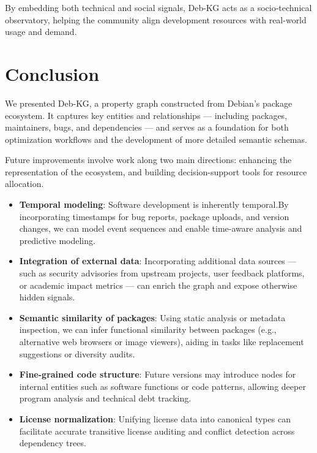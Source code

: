 \documentclass[10pt,oneside,a4paper, twocolumn]{article}
\begin{document}
    By embedding both technical and social signals, Deb-KG acts as a socio-technical observatory, helping the community align development resources with real-world usage and demand.


    \section{Conclusion}

    We presented Deb-KG, a property graph constructed from Debian’s package ecosystem.
    It captures key entities and relationships — including packages, maintainers, bugs, and dependencies — and serves as a foundation for both optimization workflows and the development of more detailed semantic schemas.

    Future improvements involve work along two main directions: enhancing the representation of the ecosystem, and building decision-support tools for resource allocation.

    \begin{itemize}
        \item \textbf{Temporal modeling}: Software development is inherently temporal.By incorporating timestamps for bug reports, package uploads, and version changes, we can model event sequences and enable time-aware analysis and predictive modeling.

        \item \textbf{Integration of external data}: Incorporating additional data sources — such as security advisories from upstream projects, user feedback platforms, or academic impact metrics — can enrich the graph and expose otherwise hidden signals.

        \item \textbf{Semantic similarity of packages}: Using static analysis or metadata inspection, we can infer functional similarity between packages (e.g., alternative web browsers or image viewers), aiding in tasks like replacement suggestions or diversity audits.

        \item \textbf{Fine-grained code structure}: Future versions may introduce nodes for internal entities such as software functions or code patterns, allowing deeper program analysis and technical debt tracking.

        \item \textbf{License normalization}: Unifying license data into canonical types can facilitate accurate transitive license auditing and conflict detection across dependency trees.
    \end{itemize}
\end{document}
